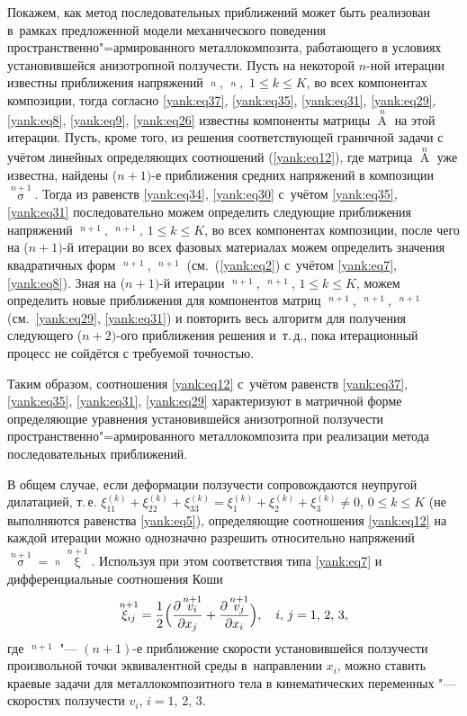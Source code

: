 Покажем, как метод последовательных приближений может быть реализован в~рамках предложенной модели механического поведения
пространственно"=армированного металлокомпозита, работающего в условиях установившейся анизотропной ползучести. 
Пусть на некоторой $n$-ной итерации известны приближения напряжений $\mathop {\sigma _0}\limits^n $, $\mathop
{\sigma _k }\limits^n, $ $1\le k\le K$, во всех компонентах композиции, тогда согласно \eqref{yank:eq37}, \eqref{yank:eq35}, \eqref{yank:eq31}, \eqref{yank:eq29}, \eqref{yank:eq8}, \eqref{yank:eq9}, \eqref{yank:eq26} известны компоненты
матрицы $\mathop A\limits^n $ на этой итерации. 
Пусть, кроме того, из решения соответствующей граничной задачи с учётом линейных определяющих
соотношений (\ref{yank:eq12}), где матрица $\mathop A\limits^n $ уже известна, найдены
($n+1)$-е приближения средних напряжений в композиции $\mathop \sigma \limits^{n+1} $. 
Тогда из равенств \eqref{yank:eq34}, \eqref{yank:eq30} с~учётом \eqref{yank:eq35}, \eqref{yank:eq31}
последовательно можем определить следующие приближения напряжений $\mathop
{\sigma _0 }\limits^{n+1} $, $\mathop {\sigma _k }\limits^{n+1} $, $1\le k\le K$, во всех компонентах композиции, после чего на ($n+1)$-й итерации во всех фазовых материалах можем определить значения квадратичных форм $\mathop {S_0 }\limits^{n+1} $, $\mathop {S_k }\limits^{n+1} $ (см.~(\ref{yank:eq2}) с~учётом \eqref{yank:eq7}, \eqref{yank:eq8}). Зная на ($n+1)$-й итерации $\mathop {S_0 }\limits^{n+1} $, $\mathop {S_k }\limits^{n+1} $, $1\le k\le K$, можем определить новые приближения для компонентов матриц $\mathop {B_k }\limits^{n+1} $, $\mathop {C_k }\limits^{n+1} $, $\mathop {E_k }\limits^{n+1} $ (см.~\eqref{yank:eq29}, \eqref{yank:eq31}) и повторить весь алгоритм для получения следующего ($n+2)$-ого приближения
решения и~т.\,д., пока итерационный процесс не сойдётся с требуемой точностью.

Таким образом, соотношения \eqref{yank:eq12} с~учётом равенств \eqref{yank:eq37}, \eqref{yank:eq35}, \eqref{yank:eq31}, \eqref{yank:eq29} характеризуют в матричной форме определяющие уравнения установившейся
анизотропной ползучести пространственно"=армированного металлокомпозита при
реализации метода последовательных приближений.

В общем случае, если деформации ползучести сопровождаются неупругой
дилатацией, т.\,е. $\xi _{11}^{(k)} +\xi _{22}^{(k)} +\xi _{33}^{(k)} =\xi
_1^{(k)} +\xi _2^{(k)} +\xi _3^{(k)} \ne 0$, $0\le k\le K$ (не выполняются
равенства \eqref{yank:eq5}), определяющие соотношения \eqref{yank:eq12} на каждой итерации можно
однозначно разрешить относительно напряжений $\mathop \sigma \limits^{n+1}
=\mathop {A^{-1}}\limits^n \mathop \xi \limits^{n+1} $. Используя при этом
соответствия типа \eqref{yank:eq7} и дифференциальные соотношения Коши \cite{yank:bib3,yank:bib8}
\[
\mathop {\xi _{ij} }\limits^{n+1} =\frac{1}{2}\Bigl( \frac{\partial \mathop
{v_i }\limits^{n+1} }{\partial x_j }+\frac{\partial \mathop {v_j
}\limits^{n+1} }{\partial x_i } \Bigr),\quad i,\,j=1,\,2,\,3,
\]
где $\mathop {v_i }\limits^{n+1} $ "--- $(n+1)$-е приближение скорости установившейся ползучести произвольной точки эквивалентной среды в~направлении $x_i$, можно ставить краевые задачи для металлокомпозитного тела в кинематических переменных "--- скоростях ползучести $v_i$, $i=1,\,2,\,3$.

